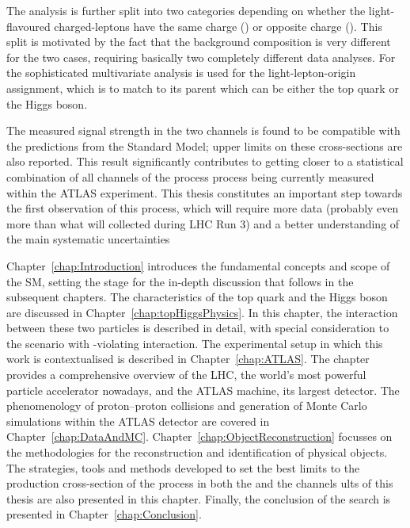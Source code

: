 The analysis is further split into two categories depending on whether the light-flavoured charged-leptons have the same charge (\dilepSStau) or opposite charge (\dilepOStau). This split is motivated by the fact that the background composition is very different for the two cases, requiring basically two completely different data analyses. For the \dilepSStau sophisticated multivariate analysis is used for the light-lepton-origin assignment, which is to match to its parent which can be either the top quark or the Higgs boson.

The measured signal strength in the two channels is found
to be compatible with the predictions from the Standard Model; upper limits on these cross-sections are also reported. 
This result significantly contributes to getting closer to a statistical combination of all channels of the process \tHq process being
currently measured within the ATLAS experiment.
This thesis constitutes an important step towards the first observation of this process, which will require more data (probably even more than what will collected during LHC Run 3) and a better understanding of the main systematic uncertainties


Chapter~\ref{chap:Introduction} introduces the fundamental concepts 
and scope of the SM, setting the stage for the in-depth discussion
that follows in the subsequent chapters.
The characteristics of the top quark and the Higgs boson are discussed in
Chapter~\ref{chap:topHiggsPhysics}. In this chapter, the interaction
between these two particles is described in detail, with 
special consideration to the scenario with \CP-violating interaction.
The experimental setup in which this work is contextualised is described in Chapter~\ref{chap:ATLAS}. 
 The chapter provides a comprehensive overview of the LHC, the world's most powerful 
 particle accelerator nowadays, and the ATLAS machine, its largest detector.
The phenomenology of proton--proton collisions and generation of Monte Carlo simulations within the ATLAS 
detector are covered in Chapter~\ref{chap:DataAndMC}. 
Chapter~\ref{chap:ObjectReconstruction} focusses on the methodologies for the reconstruction and identification of physical objects.
The strategies, tools and methods developed to set the best limits to the production cross-section of the \tHq process in 
both the \dilepOStau and the \dilepSStau channels ults of this thesis are also presented in this chapter.
Finally, the conclusion of the \tHq search is presented in Chapter~\ref{chap:Conclusion}.


